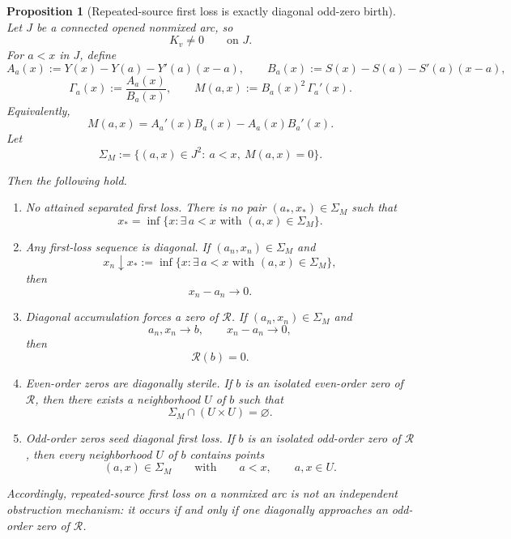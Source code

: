 \documentclass[11pt,a4paper]{amsart}
\theoremstyle{plain}
\newtheorem{proposition}[theorem]{Proposition}
\theoremstyle{definition}
\begin{document}
\begin{proposition}[Repeated-source first loss is exactly diagonal odd-zero birth]
\label{prop:first-loss-is-diagonal-odd-zero-birth}
Let $J$ be a connected opened nonmixed arc, so
\[
K_v\neq 0
\qquad\text{on }J.
\]
For $a<x$ in $J$, define
\[
A_a(x):=Y(x)-Y(a)-Y'(a)(x-a),
\qquad
B_a(x):=S(x)-S(a)-S'(a)(x-a),
\]
\[
\Gamma_a(x):=\frac{A_a(x)}{B_a(x)},
\qquad
M(a,x):=B_a(x)^2\,\Gamma_a'(x).
\]
Equivalently,
\[
M(a,x)=A_a'(x)B_a(x)-A_a(x)B_a'(x).
\]
Let
\[
\Sigma_M:=\{(a,x)\in J^2:\ a<x,\ M(a,x)=0\}.
\]

Then the following hold.

\begin{enumerate}
\item \emph{No attained separated first loss.}
There is no pair $(a_*,x_*)\in \Sigma_M$ such that
\[
x_*=\inf\{x:\exists\,a<x\text{ with }(a,x)\in \Sigma_M\}.
\]

\item \emph{Any first-loss sequence is diagonal.}
If $(a_n,x_n)\in \Sigma_M$ and
\[
x_n\downarrow x_*:=\inf\{x:\exists\,a<x\text{ with }(a,x)\in \Sigma_M\},
\]
then
\[
x_n-a_n\to 0.
\]

\item \emph{Diagonal accumulation forces a zero of $\mathcal R$.}
If $(a_n,x_n)\in\Sigma_M$ and
\[
a_n,x_n\to b,
\qquad
x_n-a_n\to 0,
\]
then
\[
\mathcal R(b)=0.
\]

\item \emph{Even-order zeros are diagonally sterile.}
If $b$ is an isolated even-order zero of $\mathcal R$, then there exists a
neighborhood $U$ of $b$ such that
\[
\Sigma_M\cap (U\times U)=\varnothing.
\]

\item \emph{Odd-order zeros seed diagonal first loss.}
If $b$ is an isolated odd-order zero of $\mathcal R$, then every
neighborhood $U$ of $b$ contains points
\[
(a,x)\in \Sigma_M
\qquad\text{with}\qquad
a<x,
\qquad
a,x\in U.
\]
\end{enumerate}

Accordingly, repeated-source first loss on a nonmixed arc is not an
independent obstruction mechanism: it occurs if and only if one diagonally
approaches an odd-order zero of $\mathcal R$.
\end{proposition}
\end{document}
